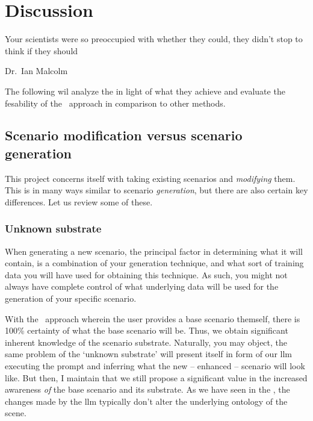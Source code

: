 
\chapter{Discussion}\label{sec:discussion}

\epigraph{Your scientists were so preoccupied with whether they could, they didn't stop to think if they should}{Dr.~Ian Malcolm}

The following wil analyze the  in light of what they achieve and evaluate the
fesability of the \hefe~approach in comparison to other methods.

\section{Scenario modification versus scenario generation}

This project concerns itself with taking existing scenarios and \emph{modifying} them. This is in
many ways similar to scenario \emph{generation}, but there are also certain key differences. Let us
review some of these.

\subsection{Unknown substrate}

When generating a new scenario, the principal factor in determining what it will contain, is a
combination of your generation technique, and what sort of training data you will have used for
obtaining this technique. As such, you might not always have complete control of what underlying
data will be used for the generation of your specific scenario.

With the \hefe~approach wherein the user provides a base scenario themself, there is \num{100}\%
certainty of what the base scenario will be. Thus, we obtain significant inherent knowledge of the
scenario substrate. Naturally, you may object, the same problem of the `unknown substrate' will
present itself in form of our \acrshort{llm} executing the prompt and inferring what the new --
enhanced -- scenario will look like. But then, I maintain that we still propose a significant value
in the increased awareness \emph{of} the base scenario and its substrate. As we have seen in the
, the changes made by the \acrshort{llm} typically don't alter the underlying
ontology of the scene.

